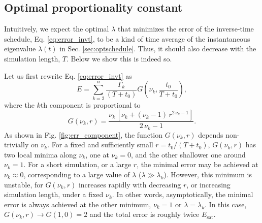 \documentclass[preprint, floatfix]{revtex4-1}
\newcommand{\Err}{E}
\begin{document}
%






\subsection{\label{sec:optlambda}
Optimal proportionality constant
}




Intuitively,
we expect the optimal $\lambda$
that minimizes the error of the inverse-time schedule,
Eq. \eqref{eq:error_invt},
to be a kind of time average of
the instantaneous eigenvalue $\lambda(t)$
in Sec. \ref{sec:optschedule}.
%
Thus, it should also decrease with
the simulation length, $T$.
%
Below we show this is indeed so.

Let us first rewrite Eq. \eqref{eq:error_invt} as
%
$$
\Err
=
\sum_{ k = 2 }^n
  \frac{ \Gamma_k  }
       { (T + t_0) }
  G\left( \nu_k, \frac{ t_0 } { T + t_0} \right),
$$
%
where the $k$th component is proportional to
%
$$
G\left( \nu_k, r \right)
=
\frac { \nu_k
        \,
        \left[
          \nu_k
          +
          (\nu_k - 1) \,
          r^{2 \, \nu_k - 1}
        \right]
      }
      { 2 \, \nu_k - 1 }
.
$$
%
As shown in Fig. \ref{fig:err_component},
the function $G(\nu_k, r)$ depends non-trivially on $\nu_k$.
%
For a fixed and sufficiently small $r = t_0 / (T + t_0)$,
$G(\nu_k, r)$ has two local minima along $\nu_k$,
one at $\nu_k = 0$,
and the other shallower one around $\nu_k = 1$.
%
For a short simulation, or a large $r$,
the minimal error may be achieved at $\nu_k \approx 0$,
corresponding to a large value of $\lambda$
($\lambda \gg \lambda_k$).
%
However, this minimum is unstable,
for $G(\nu_k, r)$ increases rapidly
with decreasing $r$, or increasing simulation length,
under a fixed $\nu_k$.
%
In other words,
asymptotically, the minimal error
is always achieved at the other minimum,
$\nu_k = 1$ or $\lambda = \lambda_k$.
%
In this case,
$G(\nu_k, r) \to G(1, 0) = 2$
and the total error is roughly twice $E_\mathrm{sat}$.
\end{document}
